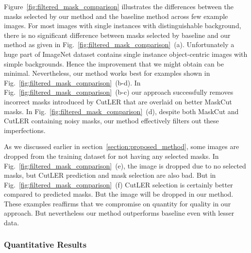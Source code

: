 Figure~\ref{fig:filtered_mask_comparison} illustrates the differences between the masks selected by our method and the baseline method across few example images. For most images with single instances with distinguishable background, there is no significant difference between masks selected by baseline and our method as given in Fig.~\ref{fig:filtered_mask_comparison}~(a). Unfortunately a huge part of ImageNet dataset contains single instance object-centric images with simple backgrounds. Hence the improvement that we might obtain can be minimal. Nevertheless, our method works best for examples shown in Fig.~\ref{fig:filtered_mask_comparison}~(b-d). In Fig.~\ref{fig:filtered_mask_comparison}~(b-c) our approach successfully removes incorrect masks introduced by CutLER that are overlaid on better MaskCut masks. In Fig.~\ref{fig:filtered_mask_comparison}~(d), despite both MaskCut and CutLER containing noisy masks, our method effectively filters out these imperfections.

As we discussed earlier in section~\ref{section:proposed_method}, some images are dropped from the training dataset for not having any selected masks. In Fig.~\ref{fig:filtered_mask_comparison}~(e), the image is dropped due to no selected masks, but CutLER prediction and mask selection are also bad. But in Fig.~\ref{fig:filtered_mask_comparison}~(f) CutLER selection is certainly better compared to predicted masks. But the image will be dropped in our method. These examples reaffirms that we compromise on quantity for quality in our approach. But nevertheless our method outperforms baseline even with lesser data.


\subsubsection{Quantitative Results}

